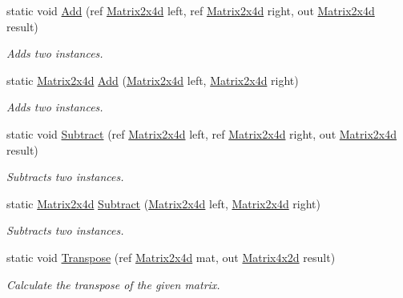 \begin{DoxyCompactItemize}
static void \hyperlink{struct_open_t_k_1_1_matrix2x4d_a8faffcf4ea40e807b80b84a67493967d}{Add} (ref \hyperlink{struct_open_t_k_1_1_matrix2x4d}{Matrix2x4d} left, ref \hyperlink{struct_open_t_k_1_1_matrix2x4d}{Matrix2x4d} right, out \hyperlink{struct_open_t_k_1_1_matrix2x4d}{Matrix2x4d} result)
\begin{DoxyCompactList}\small\item\em Adds two instances. \end{DoxyCompactList}\item 
static \hyperlink{struct_open_t_k_1_1_matrix2x4d}{Matrix2x4d} \hyperlink{struct_open_t_k_1_1_matrix2x4d_aefcf89d3a9528b6b02eab1f39c35608a}{Add} (\hyperlink{struct_open_t_k_1_1_matrix2x4d}{Matrix2x4d} left, \hyperlink{struct_open_t_k_1_1_matrix2x4d}{Matrix2x4d} right)
\begin{DoxyCompactList}\small\item\em Adds two instances. \end{DoxyCompactList}\item 
static void \hyperlink{struct_open_t_k_1_1_matrix2x4d_aaccf74129bbb455aad90869ddc7a4517}{Subtract} (ref \hyperlink{struct_open_t_k_1_1_matrix2x4d}{Matrix2x4d} left, ref \hyperlink{struct_open_t_k_1_1_matrix2x4d}{Matrix2x4d} right, out \hyperlink{struct_open_t_k_1_1_matrix2x4d}{Matrix2x4d} result)
\begin{DoxyCompactList}\small\item\em Subtracts two instances. \end{DoxyCompactList}\item 
static \hyperlink{struct_open_t_k_1_1_matrix2x4d}{Matrix2x4d} \hyperlink{struct_open_t_k_1_1_matrix2x4d_a85184adf7c74c438c3bc78cce6c9de9e}{Subtract} (\hyperlink{struct_open_t_k_1_1_matrix2x4d}{Matrix2x4d} left, \hyperlink{struct_open_t_k_1_1_matrix2x4d}{Matrix2x4d} right)
\begin{DoxyCompactList}\small\item\em Subtracts two instances. \end{DoxyCompactList}\item 
static void \hyperlink{struct_open_t_k_1_1_matrix2x4d_a9b558320a318c3cd4c8300de411d6fe8}{Transpose} (ref \hyperlink{struct_open_t_k_1_1_matrix2x4d}{Matrix2x4d} mat, out \hyperlink{struct_open_t_k_1_1_matrix4x2d}{Matrix4x2d} result)
\begin{DoxyCompactList}\small\item\em Calculate the transpose of the given matrix. \end{DoxyCompactList}\item 

\end{DoxyCompactItemize}
